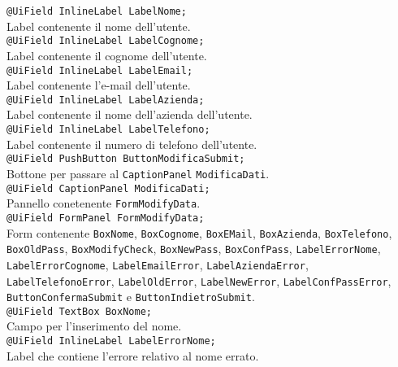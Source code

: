 {\begin{sloppypar}
{\begin{itemize}
\begin{itemize}
				\texttt{@UiField InlineLabel LabelNome;}\\
				Label contenente il nome dell'utente.\\
				
				\texttt{@UiField InlineLabel LabelCognome;}\\
				Label contenente il cognome dell'utente.\\
				
				\texttt{@UiField InlineLabel LabelEmail;}\\
				Label contenente l'e-mail dell'utente.\\
				
				\texttt{@UiField InlineLabel LabelAzienda;}\\
				Label contenente il nome dell'azienda dell'utente.\\
				
				\texttt{@UiField InlineLabel LabelTelefono;}\\
				Label contenente il numero di telefono dell'utente.\\

				\texttt{@UiField PushButton ButtonModificaSubmit;}\\
				Bottone per passare al \texttt{CaptionPanel} \texttt{ModificaDati}.\\

				\texttt{@UiField CaptionPanel ModificaDati;}\\
				Pannello conetenente \texttt{FormModifyData}.\\

				\texttt{@UiField FormPanel FormModifyData;}\\
				Form contenente \texttt{BoxNome}, \texttt{BoxCognome}, \texttt{BoxEMail}, \texttt{BoxAzienda}, \texttt{BoxTelefono}, \texttt{BoxOldPass}, \texttt{BoxModifyCheck}, \texttt{BoxNewPass}, \texttt{BoxConfPass}, \texttt{LabelErrorNome}, \texttt{LabelErrorCognome}, \texttt{LabelEmailError}, \texttt{LabelAziendaError}, \texttt{LabelTelefonoError}, \texttt{LabelOldError}, \texttt{LabelNewError}, \texttt{LabelConfPassError}, \texttt{ButtonConfermaSubmit} e \texttt{ButtonIndietroSubmit}.\\

				\texttt{@UiField TextBox BoxNome;}\\
				Campo per l'inserimento del nome.\\

				\texttt{@UiField InlineLabel LabelErrorNome;}\\
				Label che contiene l’errore relativo al nome errato.\\
				

\end{itemize}
\end{itemize}}
\end{sloppypar}}
